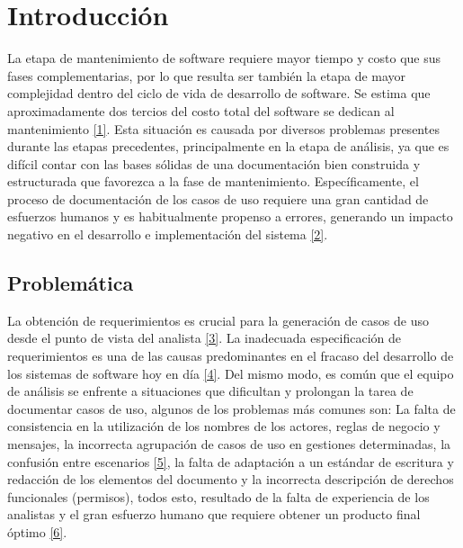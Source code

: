 \chapter{Introducción}

La etapa de mantenimiento de software requiere mayor tiempo y costo que sus fases complementarias, por lo que resulta ser también la etapa de mayor complejidad dentro del ciclo de vida de desarrollo de software. Se estima que aproximadamente dos tercios del costo total del software se dedican al mantenimiento \hyperlink{b01}{[1]}. Esta situación es causada por diversos problemas presentes durante las etapas precedentes, principalmente en la etapa de análisis, ya que es difícil contar con las bases sólidas de una documentación bien construida y estructurada que favorezca a la fase de  mantenimiento. Específicamente, el proceso de documentación de los casos de uso requiere una gran cantidad de esfuerzos humanos y es habitualmente propenso a errores, generando un impacto negativo en el desarrollo e implementación del sistema \hyperlink{b02}{[2]}. 


\section{Problemática}

La obtención de requerimientos es crucial para la generación de casos de uso desde el punto de vista del analista \hyperlink{b03}{[3]}. La inadecuada especificación de requerimientos es una de las causas predominantes en el fracaso del desarrollo de los sistemas de software hoy en día \hyperlink{b04}{[4]}. Del mismo modo, es común que el equipo de análisis se enfrente a situaciones que dificultan y prolongan la tarea de documentar casos de uso, algunos de los problemas más comunes son: La falta de consistencia en la utilización de los nombres de los actores, reglas de negocio y mensajes, la incorrecta agrupación de casos de uso en gestiones determinadas, la confusión entre escenarios \hyperlink{b05}{[5]}, la falta de adaptación a un estándar de escritura y redacción de los elementos del documento y la incorrecta descripción de derechos funcionales (permisos),  todos esto, resultado de la falta de experiencia de los analistas y el gran esfuerzo humano que requiere obtener un producto final óptimo \hyperlink{b06}{[6]}.


	
